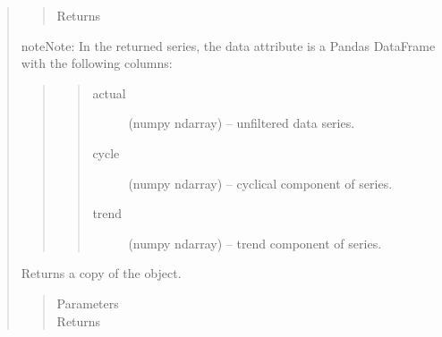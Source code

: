 \documentclass[letterpaper,10pt,english]{sphinxmanual}
\begin{document}
\begin{fulllineitems}
\begin{quote}
\begin{fulllineitems}
\begin{quote}
\begin{description}
\begin{itemize}
\end{itemize}

\item[{Returns}] \leavevmode
{\hyperref[series_class:fredpy.series]{}}

\end{description}\end{quote}

\begin{notice}{note}{Note:}
In the returned series, the data attribute is a Pandas DataFrame with the following columns:
\begin{quote}
\begin{quote}\begin{description}
\item[{actual}] \leavevmode
(numpy ndarray) --  unfiltered data series.

\item[{cycle}] \leavevmode
(numpy ndarray) --  cyclical component of series.

\item[{trend}] \leavevmode
(numpy ndarray) --  trend component of series.

\end{description}\end{quote}
\end{quote}
\end{notice}

\end{fulllineitems}


\begin{fulllineitems}
\label{series_class:fredpy.series.copy}
Returns a copy of the {\hyperref[series_class:fredpy.series]{}} object.
\begin{quote}\begin{description}
\item[{Parameters}] \leavevmode
\item[{Returns}] \leavevmode
{\hyperref[series_class:fredpy.series]{}}

\end{description}\end{quote}

\end{fulllineitems}



\end{quote}
\end{fulllineitems}
\end{document}

